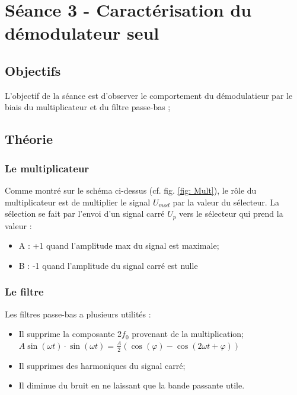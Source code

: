 

\section{Séance 3 - Caractérisation du démodulateur seul}

\subsection{Objectifs}

    L'objectif de la séance est d'observer le comportement du démodulatieur par le biais du
    multiplicateur et du filtre passe-bas ;

  

\subsection{Théorie}

\subsubsection{Le multiplicateur}


Comme montré sur le schéma ci-dessus (cf. fig. \ref{fig: Mult}), le rôle du multiplicateur
est de multiplier le signal $U_{mod}$ par la valeur du sélecteur. La sélection se fait par l'envoi
d'un signal carré $U_p$ vers le sélecteur qui prend la valeur :

\begin{itemize}
    \item A : +1 quand l'amplitude max du signal est maximale;
    \item B : -1 quand l'amplitude du signal carré est nulle 
\end{itemize}

\subsubsection{Le filtre}

Les filtres passe-bas a plusieurs utilités :

\begin{itemize}
    \item Il supprime la composante 2$f_0$ provenant de la multiplication;\\
   $ A \sin(\omega t) \cdot \sin(\omega t) = \frac{A}{2} \left( \cos(\varphi) - \cos(2\omega t + \varphi) \right)$
    \item Il supprimes des harmoniques du signal carré;
    \item Il diminue du bruit en ne laissant que la bande passante utile.
    
\end{itemize}



